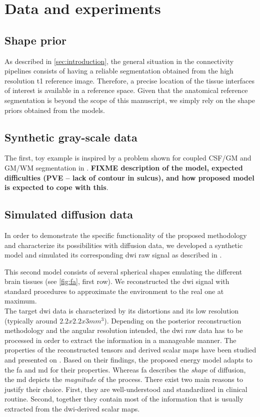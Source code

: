 \section{Data and experiments}
\label{sec:experiments}
%
\subsection{Shape prior}
%
As described in \autoref{sec:introduction}, the general situation in
the connectivity pipelines consists of having 
a reliable segmentation obtained from the high resolution \ac{t1} 
reference image. Therefore, a precise location of the tissue interfaces
of interest is available in a reference space. Given that the anatomical 
reference segmentation is beyond the scope of this manuscript, we simply 
rely on the shape priors obtained from the models.

%
\subsection{Synthetic gray-scale data}
%
The first, toy example is inspired by a problem shown for coupled CSF/GM 
and GM/WM segmentation in \cite{macdonald_automated_2000}. 
\textbf{FIXME description of the model, expected difficulties (PVE -- lack of contour in sulcus), and how proposed model is expected to cope with this}.

%
\subsection{Simulated diffusion data}
%
In order to demonstrate the specific functionality of the proposed
methodology and characterize its possibilities with diffusion data, we developed a
synthetic model and simulated its corresponding \ac{dwi}
raw signal as described in \citep{tuch_q-ball_2004}. 

This second model consists of several spherical shapes emulating
the different brain tissues (see \autoref{fig:fa}, first row). 
We reconstructed the \ac{dwi} signal with standard procedures to 
approximate the environment to the real one at maximum. \\

The target \ac{dwi} data is characterized by its distortions and its
low resolution (typically around $2.2x2.2x3mm^3$). Depending on the
posterior reconstruction methodology and the angular resolution
intended, the \ac{dwi} raw data has to be processed in order to
extract the information in a manageable manner. The properties of
the reconstructed tensors and derived scalar maps have been
studied and presented on \cite{ennis_orthogonal_2006}. Based on their
findings, the proposed energy model adapts to the \ac{fa} and \ac{md}
for their properties.
Whereas \ac{fa} describes the \emph{shape} of diffusion, 
the \ac{md} depicts the \emph{magnitude} of the process. 
There exist two main reasons to justify their choice. 
First, they are well-understood and standardized in clinical routine.
Second, together they contain most of the information that is
usually extracted from the \ac{dwi}-derived scalar maps. \\

